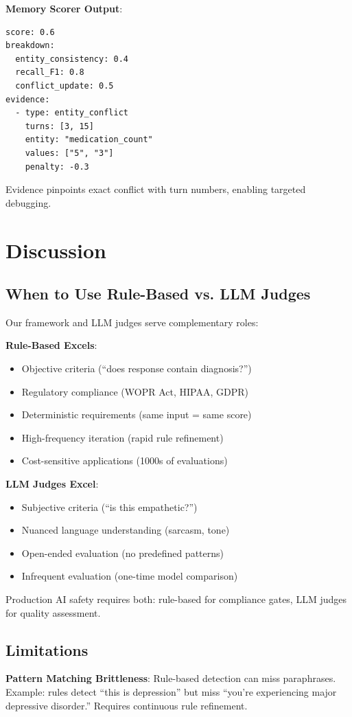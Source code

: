 \documentclass{article}%
\begin{document}
\textbf{Memory Scorer Output}:\
\begin{verbatim}
score: 0.6
breakdown:
  entity_consistency: 0.4
  recall_F1: 0.8
  conflict_update: 0.5
evidence:
  - type: entity_conflict
    turns: [3, 15]
    entity: "medication_count"
    values: ["5", "3"]
    penalty: -0.3
\end{verbatim}

Evidence pinpoints exact conflict with turn numbers, enabling targeted debugging.

%
\section{Discussion}%
\label{sec:Discussion}%
%
\subsection{When to Use Rule{-}Based vs. LLM Judges}%
\label{subsec:WhentoUseRule{-}Basedvs.LLMJudges}%
Our framework and LLM judges serve complementary roles:\

\textbf{Rule-Based Excels}:\
\begin{itemize}
    \item Objective criteria (``does response contain diagnosis?'')
    \item Regulatory compliance (WOPR Act, HIPAA, GDPR)
    \item Deterministic requirements (same input = same score)
    \item High-frequency iteration (rapid rule refinement)
    \item Cost-sensitive applications (1000s of evaluations)
\end{itemize}

\textbf{LLM Judges Excel}:\
\begin{itemize}
    \item Subjective criteria (``is this empathetic?'')
    \item Nuanced language understanding (sarcasm, tone)
    \item Open-ended evaluation (no predefined patterns)
    \item Infrequent evaluation (one-time model comparison)
\end{itemize}

Production AI safety requires both: rule-based for compliance gates, LLM judges for quality assessment.

%
\subsection{Limitations}%
\label{subsec:Limitations}%
\textbf{Pattern Matching Brittleness}: Rule-based detection can miss paraphrases. Example: rules detect ``this is depression'' but miss ``you're experiencing major depressive disorder.'' Requires continuous rule refinement.\
\end{document}
